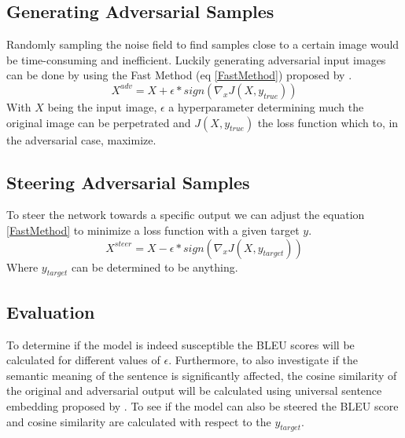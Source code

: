 \subsection*{Generating Adversarial Samples}
Randomly sampling the noise field to find samples close to a certain image would be time-consuming and inefficient. Luckily generating adversarial input images can be done by using the Fast Method (eq \ref{FastMethod}) proposed by \citeauthor{goodfellow2015explaining}.
\begin{equation}
    X^{adv} = X + \epsilon * sign(\nabla_{x}J(X, y_{true}))
    \label{FastMethod}
\end{equation}
With $X$ being the input image, $\epsilon$ a hyperparameter determining much the original image can be perpetrated and $J(X, y_{true})$ the loss function which to, in the adversarial case, maximize.

\subsection*{Steering Adversarial Samples}
To steer the network towards a specific output we can adjust the equation \ref{FastMethod} to minimize a loss function with a given target $y$.
\begin{equation}
    X^{steer} = X - \epsilon * sign(\nabla_{x}J(X, y_{target}))
\end{equation}
Where $y_{target}$ can be determined to be anything.

\subsection*{Evaluation}
To determine if the model is indeed susceptible the BLEU scores will be calculated for different values of $\epsilon$. Furthermore, to also investigate if the semantic meaning of the sentence is significantly affected, the cosine similarity of the original and adversarial output will be calculated using universal sentence embedding proposed by \citeauthor{DBLP:journals/corr/abs-1803-11175}.
To see if the model can also be steered the BLEU score and cosine similarity are calculated with respect to the $y_{target}$.
